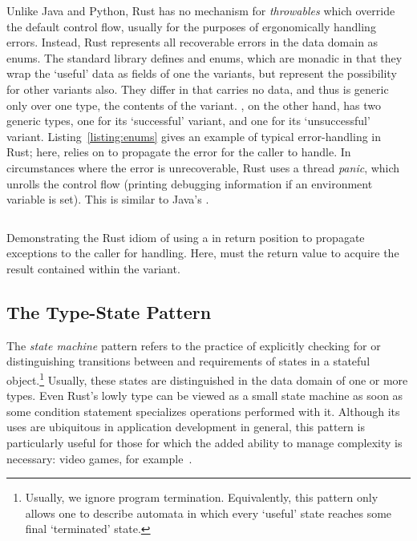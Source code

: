 Unlike Java and Python, Rust has no mechanism for \textit{throwables} which override the default control flow, usually for the purposes of ergonomically handling errors. Instead, Rust represents all recoverable errors in the data domain as enums. The standard library defines  and  enums, which are monadic in that they wrap the `useful' data as fields of one the variants, but represent the possibility for other variants also. They differ in that  carries no data, and thus  is generic only over one type, the contents of the  variant. , on the other hand, has two generic types, one for its `successful'  variant, and one for its `unsuccessful'  variant. Listing~\ref{listing:enums} gives an example of typical error-handling in Rust; here,  relies on  to propagate the error for the caller to handle. In circumstances where the error is unrecoverable, Rust uses a thread \textit{panic}, which unrolls the control flow (printing debugging information if an environment variable is set). This is similar to Java's .

\begin{listing}[ht]
	\centering
	\inputminted[]{rust}{enums.rs}
	\caption[TODO.]{Demonstrating the Rust idiom of using a  in return position to propagate exceptions to the caller for handling. Here,  must  the return value to acquire the result contained within the  variant.}
	\label{listing:enums}
\end{listing}

\subsection{The Type-State Pattern}
\label{sec:type_state}

The \textit{state machine} pattern refers to the practice of explicitly checking for or distinguishing transitions between and requirements of states in a stateful object.\footnote{Usually, we ignore program termination. Equivalently, this pattern only allows one to describe automata in which every `useful' state reaches some final `terminated' state.} Usually, these states are distinguished in the data domain of one or more types. Even Rust's lowly  type can be viewed as a small state machine as soon as some condition statement specializes operations performed with it. Although its uses are ubiquitous in application development in general, this pattern is particularly useful for those for which the added ability to manage complexity is necessary: video games, for example~\cite{nystrom2014game}.

